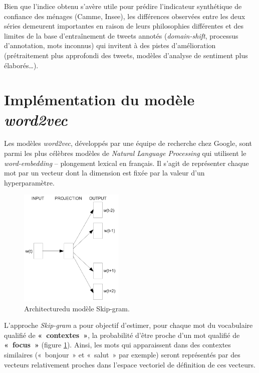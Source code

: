 \documentclass[10pt,french,french]{article}
\begin{document}
\begin{figure}[htb]

\end{figure}

Bien que l'indice obtenu s'avère utile pour prédire l'indicateur synthétique de confiance des ménages (Camme, Insee), les différences observées entre les deux séries demeurent importantes en raison de leurs philosophies différentes et des limites de la base d'entraînement de tweets annotés (\emph{domain-shift}, processus d'annotation, mots inconnus) qui invitent à des pistes d'amélioration (prétraitement plus approfondi des tweets, modèles d'analyse de sentiment plus élaborés\dots).

\newpage

\hypertarget{sec:word2vec}{%
\section{\texorpdfstring{Implémentation du modèle \emph{word2vec}}{Implémentation du modèle word2vec}}\label{sec:word2vec}}

Les modèles \emph{word2vec}, développés par une équipe de recherche chez Google, sont parmi les plus célèbres modèles de \emph{Natural Language Processing} qui utilisent le \emph{word-embedding} -- plongement lexical en français.
Il s'agit de représenter chaque mot par un vecteur dont la dimension est fixée par la valeur d'un hyperparamètre.

\begin{figure}
\includegraphics[width=5cm]{img/skip_gram.png}
\captionsetup{margin=0cm,format=hang,justification=justified}
\caption{Architecture\newline du modèle Skip-gram.}\label{fig:skipgram}
\end{figure}

L'approche \emph{Skip-gram} a pour objectif d'estimer, pour chaque mot du vocabulaire qualifié de \textbf{«~contextes~»}, la probabilité d'être proche d'un mot qualifié de \textbf{«~focus~»} (figure \ref{fig:skipgram}).
Ainsi, les mots qui apparaissent dans des contextes similaires («~bonjour~» et «~salut~» par exemple) seront représentés par des vecteurs relativement proches dans l'espace vectoriel de définition de ces vecteurs.
\end{document}
